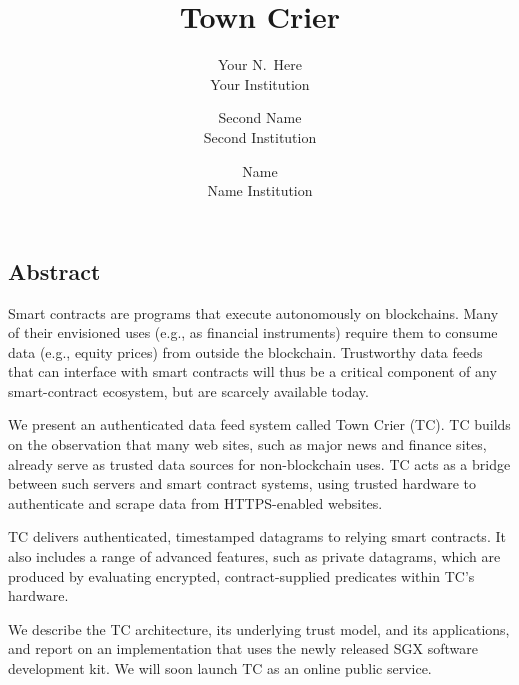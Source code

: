 \documentclass[letterpaper,twocolumn,10pt]{article}
\date{}
\title{\Large \bf Town Crier}
\author{
{\rm Your N.\ Here}\\
Your Institution
\and
{\rm Second Name}\\
Second Institution
\and
{\rm Name}\\
Name Institution
} %
\begin{document}
\maketitle


\subsection*{Abstract}
Smart contracts are programs that execute autonomously on blockchains. Many of their envisioned uses (e.g., as financial instruments) require them to consume data (e.g., equity prices) from outside the blockchain. Trustworthy data feeds that can interface with smart contracts will thus be a critical component of any smart-contract ecosystem, but are scarcely available today.

	We present an authenticated data feed system called Town Crier (TC). TC builds on the observation that many web sites, such as major news and finance sites, already serve as trusted data sources for non-blockchain uses. TC acts as a bridge between such servers and smart contract systems, using trusted hardware to authenticate and scrape data from HTTPS-enabled websites. 
	
	TC delivers authenticated, timestamped datagrams to relying smart contracts. It also includes a range of advanced features, such as private datagrams, which are produced by evaluating encrypted, contract-supplied predicates within TC's hardware.
	
	
	We describe the TC architecture, its underlying trust model, and its applications, and report on an implementation that uses the newly released SGX software development kit. We will soon launch TC as an online public service.
	








\end{document}

